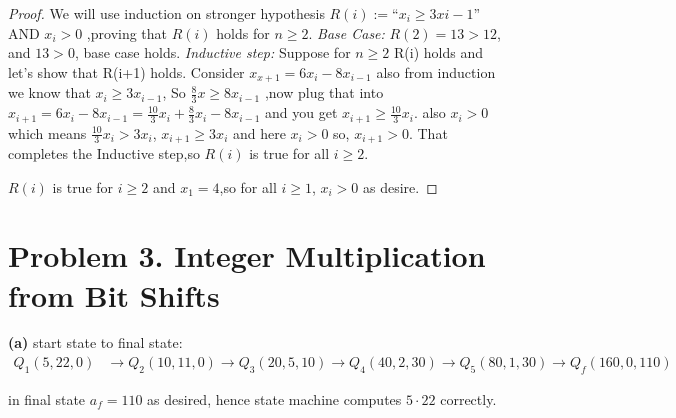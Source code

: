 \documentclass{article}
\begin{document}
\begin{proof}
    We will use induction on stronger hypothesis $R(i) := \text{``} x_i \geq 3x{i-1}\text{''}$ AND $x_i > 0$ ,proving that 
    $R(i)$ holds for $n \geq 2$.
    \newline\emph{Base Case:} $R(2) = 13 > 12$, and $13 > 0$, base case holds.
    \newline\emph{Inductive step:} Suppose for $n \geq 2$ R(i) holds and let's show that R(i+1) holds.
    Consider $x_{x+1} = 6x_i - 8x_{i-1}$ also from induction we know that $x_i \geq 3x_{i-1}$, So $ \frac{8}{3}x \geq 8x_{i-1}$ ,now plug that into 
    $x_{i+1} = 6x_i - 8x_{i-1} = \frac{10}{3}x_i + \frac{8}{3}x_i - 8x_{i-1}$ and you get $x_{i+1} \geq \frac{10}{3}x_i$. also $x_i > 0$ which means $\frac{10}{3}x_i > 3x_i$, $x_{i+1} \geq 3x_i$ and here $x_i > 0$ so, $x_{i+1} > 0$.
    That completes the Inductive step,so $R(i)$ is true for all $i \geq 2$.
    
    \noindent$R(i)$ is true for $i \geq 2$ and $x_1 = 4$,so for all $i \geq 1$, $x_i > 0$ as desire.
\end{proof}

\section*{Problem 3. Integer Multiplication from Bit Shifts}

\noindent\textbf{(a)} start state to final state:
\begin{align*}
    Q_1(5,22,0) &\longrightarrow Q_2(10,11,0) \longrightarrow Q_3(20,5,10) \longrightarrow Q_4(40,2,30) \longrightarrow Q_5(80,1,30) \longrightarrow Q_f(160,0,110)
\end{align*}

in final state $a_f = 110$ as desired, hence state machine computes $5 \cdot 22$ correctly.
\end{document}
